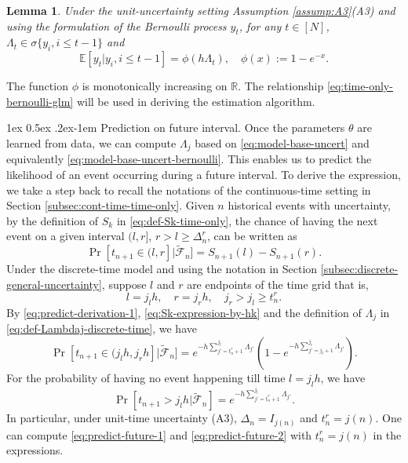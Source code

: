 \documentclass[11pt]{article}
\makeatletter
\newtheorem{lemma}[theorem]{Lemma}
\theoremstyle{remark}
\theoremstyle{plain}
\newcommand{\calF}{\mathcal{F}}
\newcommand{\E}{\mathbb{E}}
\newcommand{\R}{\mathbb{R}}
\renewcommand{\paragraph}{%
  \@startsection{paragraph}{4}%
  {\z@}{1ex \@plus 0.5ex \@minus .2ex}{-1em}%
  {\normalfont\normalsize\itshape}%
}
\makeatother
\begin{document}
\begin{lemma}\label{lemma:time-only-bernoulli-glm}
Under the unit-uncertainty setting Assumption \ref{assump:A3}(A3) and using the formulation of the Bernoulli process $y_t$, 
for any $t\in [N]$, $\Lambda_t \in \sigma\{ y_i, i\le t-1\}$ and 
\begin{equation}\label{eq:time-only-bernoulli-glm}
\E [ y_t |  y_i, i\le t-1 ] = \phi( h   \Lambda_t ), 
\quad \phi(x):= 1-e^{-x}.
\end{equation}
\end{lemma}
%
The function $\phi$ is monotonically increasing on $\R$.
The relationship \eqref{eq:time-only-bernoulli-glm} will be used in deriving the estimation algorithm. 







\paragraph{Prediction on future interval.}
Once the parameters $\theta$ are learned from data, we can compute $\Lambda_j$ based on \eqref{eq:model-base-uncert} and equivalently \eqref{eq:model-base-uncert-bernoulli}.
This enables us to predict the likelihood of an event occurring during a future interval.
%
To derive the expression, we take a step back to recall the notations of the continuous-time setting in Section \ref{subsec:cont-time-time-only}.
Given $n$ historical events with uncertainty, 
by the definition of $S_k$ in \eqref{eq:def-Sk-time-only}, the chance of having the next event on a given interval $( l ,r]$, $r > l \ge  \Delta_{n}^r$, 
can be written as
\begin{equation}\label{eq:predict-derivation-1}
\Pr [t_{n+1} \in (l, r] | \tilde{\calF}_{n} ]
=  S_{n+1}(l) - S_{n+1}(r).
\end{equation}
Under the discrete-time model and using the notation in Section \ref{subsec:discrete-general-uncertainty}, suppose $l$ and $r$ are endpoints of the time grid that is,
\[
l = j_l h , \quad r = j_r h , \quad j_r > j_l \ge t_n^r.
\]
By \eqref{eq:predict-derivation-1}, \eqref{eq:Sk-expression-by-hk} and the definition of $\Lambda_j$ in \eqref{eq:def-Lambdaj-discrete-time},
we have
\begin{equation}\label{eq:predict-future-1}
\Pr [t_{n+1} \in ( j_l h, j_r h] | \tilde{\calF}_{n} ]
= e^{ - h \sum_{j' = t_n^r +1}^{j_l} \Lambda_{j'}} \left( 1 -  e^{ - h \sum_{j' =j_l+1}^{j_r} \Lambda_{j'}} \right).
\end{equation}
For the probability of having no event happening till time $l = j_l h$, we have
\begin{equation}\label{eq:predict-future-2}
\Pr [t_{n+1} > j_l h  | \tilde{\calF}_{n} ]
= e^{ - h \sum_{j' =t_n^r +1}^{j_l} \Lambda_{j'}}.
\end{equation}
In particular, under unit-time uncertainty (A3), 
$\Delta_{n} = I_{ j(n) }$ and $t_n^r = j(n)$.  
One can compute \eqref{eq:predict-future-1} and \eqref{eq:predict-future-2} with $t_n^r = j(n)$ in the expressions. 
\end{document}
